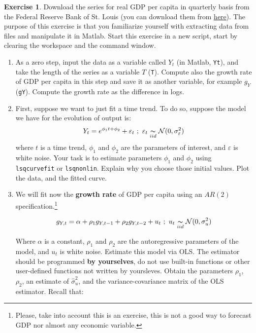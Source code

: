 \documentclass[a4paper,11pt]{article}
\theoremstyle{definition}
\newtheorem{exercise}{Exercise}
\begin{document}
\begin{exercise}
Download the series for real GDP per capita in quarterly basis from the Federal Reserve Bank of St. Louis (you can download them from \href{https://fred.stlouisfed.org/series/A939RX0Q048SBEA}{here}). The purpose of this exercise is that you familiarize yourself with extracting data from files and manipulate it in Matlab. Start this exercise in a new script, start by clearing the workspace and the command window.

\begin{enumerate}
  \item As a zero step, input the data as a variable called $Y_t$ (in Matlab, \verb;Yt;), and take the length of the series as a variable $T$ (\verb;T;). Compute also the growth rate of GDP per capita in this step and save it as another variable, for example $g_Y$ (\verb;gY;). Compute the growth rate as the difference in logs.
	\item First, suppose we want to just fit a time trend. To do so, suppose the model we have for the evolution of output is:
	\begin{equation}
	Y_t = e^{\phi_1 t + \phi_2} + \varepsilon_t \ ; \ \varepsilon_t \underset{iid}{\thicksim} \mathcal{N}(0,\sigma^2_{\varepsilon})
	\label{model_1}
	\end{equation}
	where $t$ is a time trend, $\phi_1$ and $\phi_2$ are the parameters of interest, and $\varepsilon$ is white noise. Your task is to estimate parameters $\phi_1$ and $\phi_2$ using \verb;lsqcurvefit; or \verb;lsqnonlin;. Explain why you choose those initial values. Plot the data, and the fitted curve.

	\item We will fit now the \textbf{growth rate} of GDP per capita using an $AR(2)$ specification.\footnote{Please, take into account this is an exercise, this is not a good way to forecast GDP nor almost any economic variable.}
	
		\begin{equation}
		g_{Y,t} = \alpha + \rho_1 g_{Y,t-1} + \rho_2 g_{Y,t-2} + u_t \ ; \ u_t \underset{iid}{\thicksim} \mathcal{N}(0, \sigma^2_u)
		\label{model_2}
		\end{equation}
		
	Where $\alpha$ is a constant, $\rho_1$ and $\rho_2$ are the autoregressive parameters of the model, and $u_t$ is white noise. Estimate this model via OLS. The estimator should be programmed \textbf{by yourselves}, do not use built-in functions or other user-defined functions not written by yoursleves. Obtain the parameters $\rho_1$, $\rho_2$, an estimate of $\hat{\sigma}^2_u$, and the variance-covariance matrix of the OLS estimator. Recall that:
		

\end{enumerate}
\end{exercise}
\end{document}
